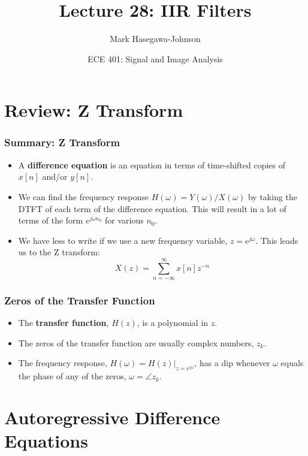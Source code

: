 \documentclass{beamer}
\title{Lecture 28: IIR Filters}
\author{Mark Hasegawa-Johnson}
\date{ECE 401: Signal and Image Analysis}
\begin{document}
\begin{frame}
  \maketitle
\end{frame}

\begin{frame}
  \tableofcontents
\end{frame}

\section[Review]{Review: Z Transform}
\setcounter{subsection}{1}

\begin{frame}
  \frametitle{Summary: Z Transform}
  \begin{itemize}
  \item A {\bf difference equation} is an equation in terms of
    time-shifted copies of $x[n]$ and/or $y[n]$.
  \item We can find the frequency response
    $H(\omega)=Y(\omega)/X(\omega)$ by taking the DTFT of each term of
    the difference equation.  This will result in a lot of terms of
    the form $e^{j\omega n_0}$ for various $n_0$.
  \item We have less to write if we use a new frequency variable,
    $z=e^{j\omega}$.  This leads us to the Z transform:
    \[
    X(z) = \sum_{n=-\infty}^\infty x[n]z^{-n}
    \]
  \end{itemize}
\end{frame}

\begin{frame}
  \frametitle{Zeros of the Transfer Function}
  \begin{itemize}
  \item The {\bf transfer function}, $H(z)$, is a polynomial in $z$.
  \item The zeros of the transfer function are usually complex numbers, $z_k$.
  \item The frequency response, $H(\omega) = H(z)\vert_{z=e^{j\omega}}$, has a dip
    whenever $\omega$ equals the phase of any of the zeros, $\omega=\angle z_k$.
  \end{itemize}
\end{frame}
    
\section[Autoregressive]{Autoregressive Difference Equations}
\setcounter{subsection}{1}
\end{document}
